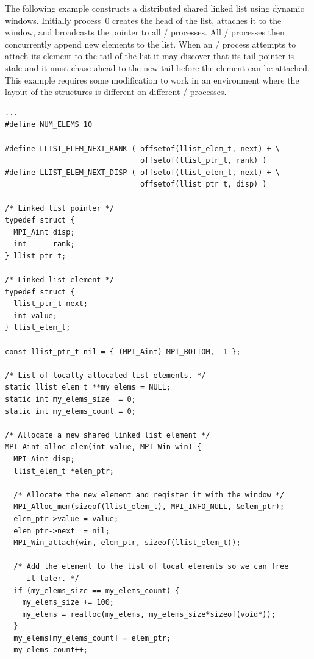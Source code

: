 \begin{example}
The following example constructs a distributed shared linked list using dynamic
windows.  Initially process~0 creates the head of the list, attaches it to
the window, and broadcasts the pointer to all \mpi/ processes.  All \mpi/ processes then
concurrently append  new elements to the list.  When an \mpi/
process attempts to 
attach its element to the tail of the list it may discover that its tail pointer
is stale and it must chase ahead to the new tail before the element can be
attached.
This example requires some modification to
work in an environment where the layout of the structures is different on
different \mpi/ processes.

%
\begin{lstlisting}[language={[MPI]C},basicstyle=\lstsmall]
...
#define NUM_ELEMS 10

#define LLIST_ELEM_NEXT_RANK ( offsetof(llist_elem_t, next) + \
                               offsetof(llist_ptr_t, rank) )
#define LLIST_ELEM_NEXT_DISP ( offsetof(llist_elem_t, next) + \
                               offsetof(llist_ptr_t, disp) )

/* Linked list pointer */
typedef struct {
  MPI_Aint disp;
  int      rank;
} llist_ptr_t;

/* Linked list element */
typedef struct {
  llist_ptr_t next;
  int value;
} llist_elem_t;

const llist_ptr_t nil = { (MPI_Aint) MPI_BOTTOM, -1 };

/* List of locally allocated list elements. */
static llist_elem_t **my_elems = NULL;
static int my_elems_size  = 0;
static int my_elems_count = 0;

/* Allocate a new shared linked list element */
MPI_Aint alloc_elem(int value, MPI_Win win) {
  MPI_Aint disp;
  llist_elem_t *elem_ptr;

  /* Allocate the new element and register it with the window */
  MPI_Alloc_mem(sizeof(llist_elem_t), MPI_INFO_NULL, &elem_ptr);
  elem_ptr->value = value;
  elem_ptr->next  = nil;
  MPI_Win_attach(win, elem_ptr, sizeof(llist_elem_t));

  /* Add the element to the list of local elements so we can free
     it later. */
  if (my_elems_size == my_elems_count) {
    my_elems_size += 100;
    my_elems = realloc(my_elems, my_elems_size*sizeof(void*));
  }
  my_elems[my_elems_count] = elem_ptr;
  my_elems_count++;


\end{lstlisting}
\end{example}
